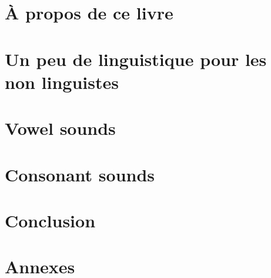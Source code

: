 \documentclass[12pt,a4paper, xetex, hyperref]{book}
\begin{document}


\author{Laurent Garnier}




\dominitoc
{}


\frontmatter

\part{À propos de ce livre}

\parttoc





\newpage
\listoffigures
\listoftables
\newpage

\mainmatter
\parttoc

\part{Un peu de linguistique pour les non linguistes}



\part{Vowel sounds}\label{part:vow}



\part{Consonant sounds}\label{part:conson}



\part{Conclusion}\label{part:conc}



\part{Annexes}\label{part:annexe}

\appendix



\backmatter

\tableofcontents
\end{document}

